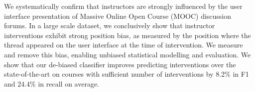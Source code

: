 We systematically confirm that instructors are strongly influenced by the user interface presentation of Massive Online Open Course (MOOC) discussion forums. In a large scale dataset, we conclusively show that instructor interventions exhibit strong position bias, as measured by the position where the thread appeared on the user interface at the time of intervention.  We measure and remove this bias, enabling unbiased statistical modelling and evaluation. We show that our de-biased classifier improves predicting interventions over the state-of-the-art on courses with sufficient number of interventions by 8.2\% in F1 and 24.4\% in recall on average.
